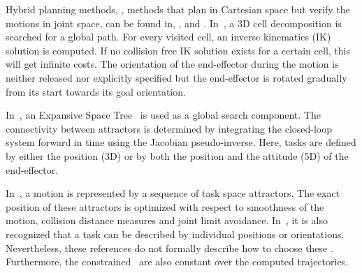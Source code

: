 Hybrid planning methods, \ie, methods that plan in Cartesian space but verify the motions in joint space, can be found in, \eg, \citet{Ojdanic2007,Behnisch2010} and \citet{Behnisch2011}. In~\citet{Ojdanic2007}, a 3D cell decomposition is searched for a global path. For every visited cell, an inverse kinematics (IK) solution is computed. If no collision free IK solution exists for a certain cell, this will get infinite costs. The orientation of the end-effector during the motion is neither released nor explicitly specified but the end-effector is rotated gradually from its start towards its goal orientation.

In~\citet{Behnisch2010,Behnisch2011}, an Expansive Space Tree~\citep{Hsu2002} is used as a global search component. The connectivity between attractors is determined by integrating the closed-loop system forward in time using the Jacobian pseudo-inverse. Here, tasks are defined by either the position (3D) or by both the position and the attitude (5D) of the end-effector. %

In~\citet{Toussaint2007}, a motion is represented by a sequence of task space attractors. The exact position of these attractors is optimized with respect to smoothness of the motion, collision distance measures and joint limit avoidance.
In~\citet{Gienger2008}, it is also recognized that a task can be described by individual positions or orientations. Nevertheless, these references do not formally describe how to choose these \dofs. Furthermore, the constrained \dofs\ are also constant over the computed trajectories.

